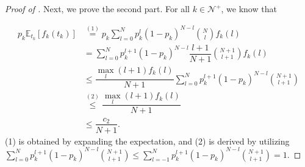 \documentclass[11pt]{article}
\theoremstyle{plain}
\theoremstyle{definition}
\newcommand{\knwModel}{\phi_{\text{knw}}}
\newcommand{\dataerror}{\mathsf{Red}_D}
\begin{document}
\begin{proof}[Proof of ]

    Next, we prove the second part. For all $k\in \mathcal{N}^+$, we know that 

    
    \begin{align*}
        p_k\mathbb{E}_{t_k}[f_k(t_k)] &\overset{(1)}{=} p_k\sum\limits_{l=0}^N p_k^l (1-p_k)^{N-l}\binom{N}{l}f_k(l) \\
        &= \sum\limits_{l=0}^N p_k^{l+1} (1-p_k)^{N-l}\dfrac{l+1}{N+1}\binom{N+1}{l+1}f_k(l) \\
        &\le \dfrac{\max\limits_{l} (l+1)f_k(l)}{N+1}\sum\limits_{l=0}^N p_k^{l+1} (1-p_k)^{N-l}\binom{N+1}{l+1} \\
        &\overset{(2)}{\le} \dfrac{\max\limits_{l} (l+1)f_k(l)}{N+1}\\ &\le \dfrac{c_2}{N+1}.
    \end{align*}
    (1) is obtained by expanding the expectation, and (2) is derived by utilizing 
    \\
    $\sum\limits_{l=0}^N p_k^{l+1} (1-p_k)^{N-l}\binom{N+1}{l+1}\le \sum\limits_{l=-1}^N p_k^{l+1} (1-p_k)^{N-l}\binom{N+1}{l+1}=1.$


\end{proof}
\end{document}

